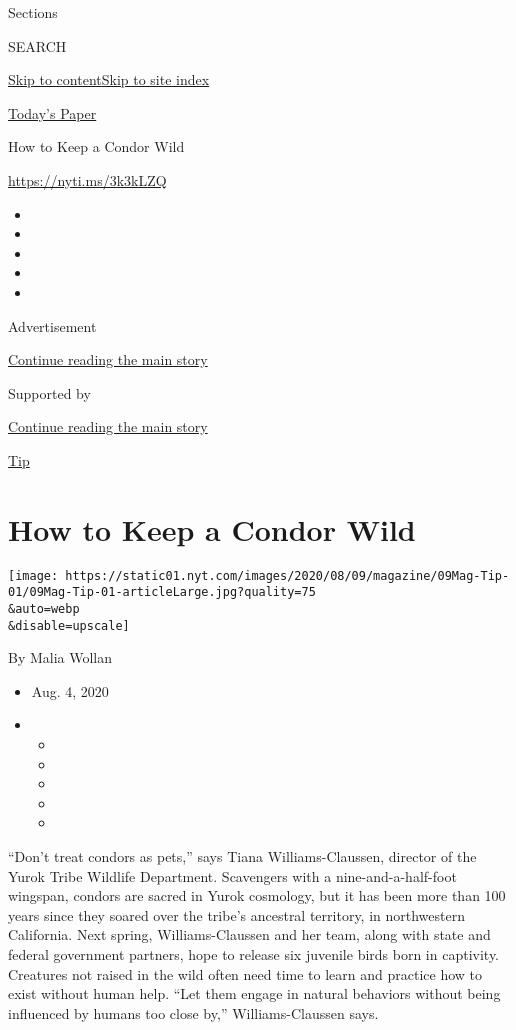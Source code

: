 Sections

SEARCH

\protect\hyperlink{site-content}{Skip to
content}\protect\hyperlink{site-index}{Skip to site index}

\href{https://myaccount.nytimes.com/auth/login?response_type=cookie\&client_id=vi}{}

\href{https://www.nytimes.com/section/todayspaper}{Today's Paper}

How to Keep a Condor Wild

\href{https://nyti.ms/3k3kLZQ}{https://nyti.ms/3k3kLZQ}

\begin{itemize}
\item
\item
\item
\item
\item
\end{itemize}

Advertisement

\protect\hyperlink{after-top}{Continue reading the main story}

Supported by

\protect\hyperlink{after-sponsor}{Continue reading the main story}

\href{/column/magazine-tip}{Tip}

\hypertarget{how-to-keep-a-condor-wild}{%
\section{How to Keep a Condor Wild}\label{how-to-keep-a-condor-wild}}

\texttt{[image: https://static01.nyt.com/images/2020/08/09/magazine/09Mag-Tip-01/09Mag-Tip-01-articleLarge.jpg?quality=75\\\&auto=webp\\\&disable=upscale]}

By Malia Wollan

\begin{itemize}
\item
  Aug. 4, 2020
\item
  \begin{itemize}
  \item
  \item
  \item
  \item
  \item
  \end{itemize}
\end{itemize}

``Don't treat condors as pets,'' says Tiana Williams-Claussen, director
of the Yurok Tribe Wildlife Department. Scavengers with a
nine-and-a-half-foot wingspan, condors are sacred in Yurok cosmology,
but it has been more than 100 years since they soared over the tribe's
ancestral territory, in northwestern California. Next spring,
Williams-Claussen and her team, along with state and federal government
partners, hope to release six juvenile birds born in captivity.
Creatures not raised in the wild often need time to learn and practice
how to exist without human help. ``Let them engage in natural behaviors
without being influenced by humans too close by,'' Williams-Claussen
says.

